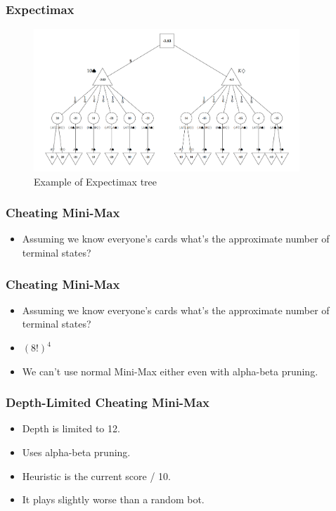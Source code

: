 \documentclass{beamer}
\begin{document}
\begin{frame}\frametitle{Expectimax}
    \begin{center}
        \begin{figure}
        \caption{Example of Expectimax tree}
	    \includegraphics[width=10cm]{MiniMax_Tree.png}
        \end{figure}
    \end{center}        
\end{frame}


\begin{frame}\frametitle{Cheating Mini-Max}
    \begin{itemize}
        \item Assuming we know everyone's cards what's the approximate number of terminal states?
    \end{itemize}
\end{frame}

\begin{frame}\frametitle{Cheating Mini-Max}
        \begin{itemize}
            \item Assuming we know everyone's cards what's the approximate number of terminal states?
            \item $(8!)^4$
            \item We can't use normal Mini-Max either even with alpha-beta pruning.
        \end{itemize}
\end{frame}

\begin{frame}\frametitle{Depth-Limited Cheating Mini-Max}
    \begin{itemize}
        \item Depth is limited to 12.
        \item Uses alpha-beta pruning.
        \item Heuristic is the current score / 10.
        \item It plays slightly worse than a random bot.
    \end{itemize}
\end{frame}
\end{document}
